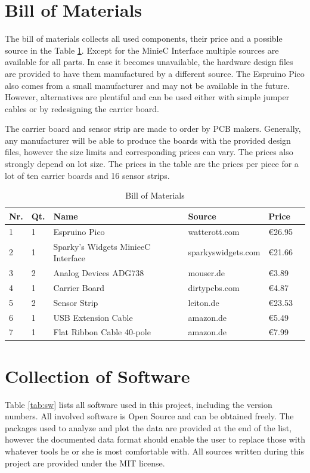 \section{Bill of Materials} \label{BOM}

The bill of materials collects all used components, their price and a possible source in the Table \ref{tab:bom}. Except for the MinieC Interface multiple sources are available for all parts. In case it becomes unavailable, the hardware design files are provided to have them manufactured by a different source. The Espruino Pico also comes from a small manufacturer and may not be available in the future. However, alternatives are plentiful and can be used either with simple jumper cables or by redesigning the carrier board.

The carrier board and sensor strip are made to order by PCB makers. Generally, any manufacturer will be able to produce the boards with the provided design files, however the size limits and corresponding prices can vary. The prices also strongly depend on lot size. The prices in the table are the prices per piece for a lot of ten carrier boards and 16 sensor strips.

\begin{table}[H]
    \centering

    \caption[Bill of Materials]{Bill of Materials}
    \label{tab:bom}
    \begin{tabular}{llllll}
        	\toprule
        	Nr. & Qt. & Name & Source & Price \tabularnewline
        	\midrule
		1 & 1 & Espruino Pico & watterott.com & \euro{26.95} \tabularnewline
		2 & 1 & Sparky's Widgets MinieeC Interface & sparkyswidgets.com & \euro{21.66} \tabularnewline
		3 & 2 & Analog Devices ADG738 & mouser.de & \euro{3.89} \tabularnewline
		4 & 1 & Carrier Board & dirtypcbs.com & \euro{4.87} \tabularnewline
		5 & 2 & Sensor Strip & leiton.de & \euro{23.53} \tabularnewline
		6 & 1 & USB Extension Cable & amazon.de & \euro{5.49} \tabularnewline
		7 & 1 &  Flat Ribbon Cable 40-pole & amazon.de & \euro{7.99} \tabularnewline
        \bottomrule
    \end{tabular}
\end{table}

\section{Collection of Software}

Table \ref{tab:sw} lists all software used in this project, including the version numbers. All involved software is Open Source and can be obtained freely. The packages used to analyze and plot the data are provided at the end of the list, however the documented data format should enable the user to replace those with whatever tools he or she is most comfortable with. All sources written during this project are provided under the MIT license.

